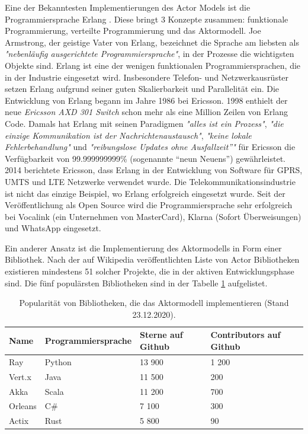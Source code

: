 Eine der Bekanntesten Implementierungen des Actor Models ist die Programmiersprache Erlang \cite{Armstrong93concurrentprogramming}. Diese bringt 3 Konzepte zusammen: funktionale Programmierung, verteilte Programmierung und das Aktormodell. Joe Armstrong, der geistige Vater von Erlang, bezeichnet die Sprache am liebsten als \textit{"nebenläufig ausgerichtete Programmiersprache"}, in der Prozesse die wichtigsten Objekte sind. Erlang ist eine der wenigen funktionalen Programmiersprachen, die in der Industrie eingesetzt wird. Insbesondere Telefon- und Netzwerkausrüster setzen Erlang aufgrund seiner guten Skalierbarkeit und Parallelität ein. Die Entwicklung von Erlang begann im Jahre 1986 bei Ericsson. 1998 enthielt der neue \textit{Ericsson AXD 301 Switch} schon mehr als eine Million Zeilen von Erlang Code. Damals hat Erlang mit seinen Paradigmen \textit{"alles ist ein Prozess"}, \textit{"die einzige Kommunikation ist der Nachrichtenaustausch"}, \textit{"keine lokale Fehlerbehandlung"} und \textit{"reibungslose Updates ohne Ausfallzeit”"} für Ericsson die Verfügbarkeit von 99.999999999\% (sogenannte “neun Neuens”) gewährleistet. 2014 berichtete Ericsson, dass Erlang in der Entwicklung von Software für GPRS, UMTS und LTE Netzwerke verwendet wurde. Die Telekommunikationsindustrie ist nicht das einzige Beispiel, wo Erlang erfolgreich eingesetzt wurde. Seit der Veröffentlichung als Open Source wird die Programmiersprache sehr erfolgreich bei Vocalink (ein Unternehmen von MasterCard), Klarna (Sofort Überweisungen) und WhatsApp eingesetzt.

Ein anderer Ansatz ist die Implementierung des Aktormodells in Form einer Bibliothek. Nach der auf Wikipedia veröffentlichten Liste von Actor Bibliotheken existieren mindestens 51 solcher Projekte, die in der aktiven Entwicklungsphase sind. Die fünf populärsten Bibliotheken sind in der Tabelle \ref{tab:vergleichBibliotheken} aufgelistet.

\begin{table} \centering
	\begin{tabular}{|p{1.5cm}|p{4cm}|p{3.5cm}|p{3.5cm}|} 
		\hline
		\textbf{Name} & \textbf{Programmiersprache} & \textbf{Sterne auf Github} & \textbf{Contributors auf Github}\\
		
		\hline
		Ray & Python & 13 900 & 1 200 \\
		
		\hline
		Vert.x & Java & 11 500 & 200 \\
		
		\hline
		Akka & Scala & 11 200 & 700 \\
		
		\hline
		Orleans & C\# & 7 100 & 300 \\
		
		\hline
		Actix & Rust & 5 800 & 90 \\

		\hline
	\end{tabular}
	\caption{Popularität von Bibliotheken, die das Aktormodell implementieren (Stand 23.12.2020).}
	\label{tab:vergleichBibliotheken}
\end{table}

